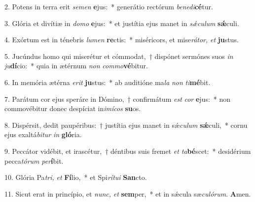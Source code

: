 \item 2. Potens in terra erit \textit{semen} \textbf{e}jus:~* generátio rectórum \textit{benedi}\textbf{cé}tur.
\item 3. Glória et divítiæ in \textit{domo} \textbf{e}jus:~* et justítia ejus manet in \textit{sǽculum} \textbf{sǽ}culi.
\item 4. Exórtum est in ténebris \textit{lumen} \textbf{re}ctis:~* miséricors, et mise\textit{rátor,} \textit{et} \textbf{ju}stus.
\item 5. Jucúndus homo qui miserétur et cómmodat,~† dispónet sermónes suos \textit{in} \textit{ju}\textbf{dí}cio:~* quia in ætérnum \textit{non} \textit{commo}\textbf{vé}bitur.
\item 6. In memória ætérna \textit{erit} \textbf{ju}stus:~* ab auditióne ma\textit{la} \textit{non} \textit{ti}\textbf{mé}bit.
\item 7. Parátum cor ejus speráre in Dómino,~† confirmátum \textit{est} \textit{cor} \textbf{e}jus:~* non commovébitur donec despíciat in\textit{imícos} \textbf{su}os.
\item 8. Dispérsit, dedit paupéribus:~† justítia ejus manet in sǽ\textit{culum} \textbf{sǽ}culi,~* cornu ejus exaltá\textit{bitur} \textit{in} \textbf{gló}ria.
\item 9. Peccátor vidébit, et irascétur,~† déntibus suis fremet \textit{et} \textit{ta}\textbf{bé}scet:~* desidérium pecca\textit{tórum} \textit{per}\textbf{í}bit.

\item 10. Glória Pa\hspace{0.04em}\textit{tri,} \textit{et} \textbf{Fí}lio,~* et Spi\textit{rítui} \textbf{San}cto.

\item 11. Sicut erat in princípio, et \textit{nunc,} \textit{et} \textbf{sem}per,~* et in sǽcula sæ\textit{culórum}. \textbf{A}men.

